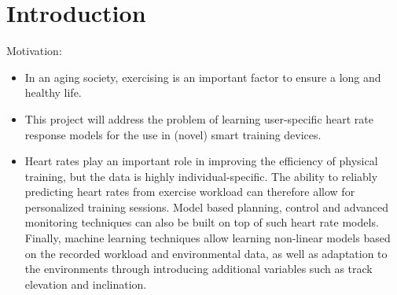 \section{Introduction}

Motivation:
\begin{itemize}
    \item In an aging society, exercising is an important factor to ensure a long and healthy life.
    \item This project will address the problem of learning user-specific heart rate response models for the use in (novel) smart training devices.
    \item Heart rates play an important role in improving the efficiency of physical training, but the data is highly individual-specific. The ability to reliably predicting heart rates from exercise workload can therefore allow for personalized training sessions. Model based planning, control and advanced monitoring techniques can also be built on top of such heart rate models. Finally, machine learning techniques allow learning non-linear models based on the recorded workload and environmental data, as well as adaptation to the environments through introducing additional variables such as track elevation and inclination.
\end{itemize}


